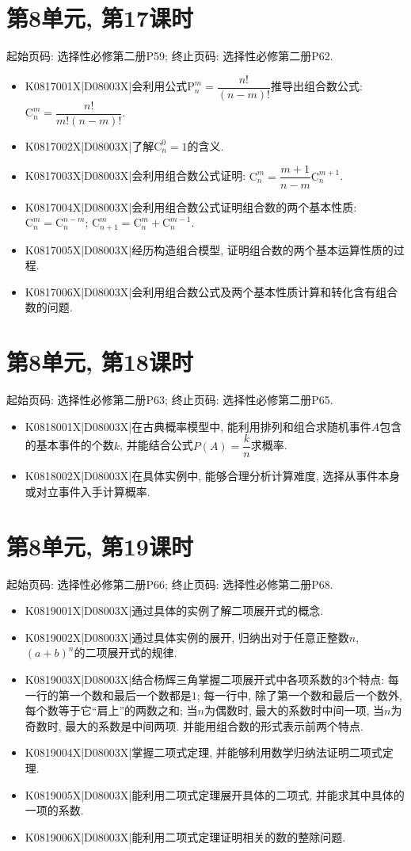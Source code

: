 \section*{第8单元, 第17课时}
起始页码: 选择性必修第二册P59; 终止页码: 选择性必修第二册P62.
\begin{itemize}
\item K0817001X|D08003X|会利用公式$\mathrm{P}_n^m=\dfrac{n!}{(n-m)!}$推导出组合数公式: $\mathrm{C}_n^m=\dfrac{n!}{m!(n-m)!}$.
\item K0817002X|D08003X|了解$\mathrm{C}_n^0=1$的含义.
\item K0817003X|D08003X|会利用组合数公式证明: $\mathrm{C}_n^m=\dfrac{m+1}{n-m}\mathrm{C}_n^{m+1}$.
\item K0817004X|D08003X|会利用组合数公式证明组合数的两个基本性质: $\mathrm{C}_n^m=\mathrm{C}_n^{n-m}$; $\mathrm{C}_{n+1}^m=\mathrm{C}_n^m+\mathrm{C}_n^{m-1}$.
\item K0817005X|D08003X|经历构造组合模型, 证明组合数的两个基本运算性质的过程.
\item K0817006X|D08003X|会利用组合数公式及两个基本性质计算和转化含有组合数的问题.
\end{itemize}

\section*{第8单元, 第18课时}
起始页码: 选择性必修第二册P63; 终止页码: 选择性必修第二册P65.
\begin{itemize}
\item K0818001X|D08003X|在古典概率模型中, 能利用排列和组合求随机事件$A$包含的基本事件的个数$k$, 并能结合公式$P(A)=\dfrac kn$求概率.
\item K0818002X|D08003X|在具体实例中, 能够合理分析计算难度, 选择从事件本身或对立事件入手计算概率.
\end{itemize}

\section*{第8单元, 第19课时}
起始页码: 选择性必修第二册P66; 终止页码: 选择性必修第二册P68.
\begin{itemize}
\item K0819001X|D08003X|通过具体的实例了解二项展开式的概念.
\item K0819002X|D08003X|通过具体实例的展开, 归纳出对于任意正整数$n$, $(a+b)^n$的二项展开式的规律.
\item K0819003X|D08003X|结合杨辉三角掌握二项展开式中各项系数的$3$个特点: 每一行的第一个数和最后一个数都是$1$; 每一行中, 除了第一个数和最后一个数外, 每个数等于它``肩上''的两数之和; 当$n$为偶数时, 最大的系数时中间一项, 当$n$为奇数时, 最大的系数是中间两项. 并能用组合数的形式表示前两个特点.
\item K0819004X|D08003X|掌握二项式定理, 并能够利用数学归纳法证明二项式定理.
\item K0819005X|D08003X|能利用二项式定理展开具体的二项式, 并能求其中具体的一项的系数.
\item K0819006X|D08003X|能利用二项式定理证明相关的数的整除问题.
\end{itemize}

